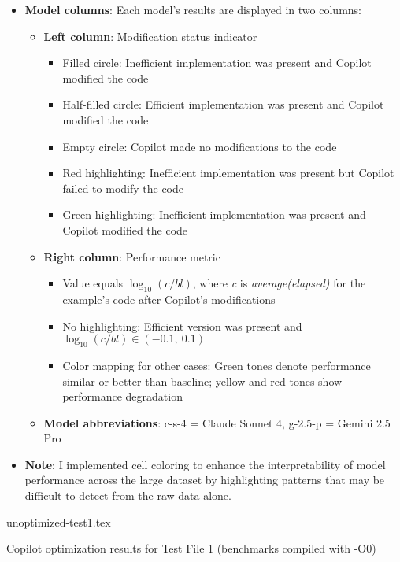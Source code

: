 \begin{itemize}
  \item \textbf{Model columns}: Each model's results are displayed in two columns:
        \begin{itemize}
          \item \textbf{Left column}: Modification status indicator
                \begin{itemize}
                  \item Filled circle: Inefficient implementation was present and Copilot modified the code
                  \item Half-filled circle: Efficient implementation was present and Copilot modified the code
                  \item Empty circle: Copilot made no modifications to the code
                  \item Red highlighting: Inefficient implementation was present but Copilot failed to modify the code
                  \item Green highlighting: Inefficient implementation was present and Copilot modified the code
                \end{itemize}
          \item \textbf{Right column}: Performance metric
                \begin{itemize}
                  \item Value equals $\log_{10}(c / bl)$, where \emph{c} is \emph{average(elapsed)} for the example's code after Copilot's modifications
                  \item No highlighting: Efficient version was present and $\log_{10}(c / bl) \in (-0.1,\ 0.1)$
                  \item Color mapping for other cases: Green tones denote performance similar or better than baseline; yellow and red tones show performance degradation
                \end{itemize}
                \item \textbf{Model abbreviations}: c-s-4 = Claude Sonnet 4, g-2.5-p = Gemini 2.5 Pro
        \end{itemize}
  \item \textbf{Note}: I implemented cell coloring to enhance the interpretability of model performance across the large dataset by highlighting patterns that may be difficult to detect from the raw data alone.
\end{itemize}

\begin{table}
  \centering
  {unoptimized-test1.tex}
  \caption{Copilot optimization results for Test File 1 (benchmarks compiled with -O0)}
  \label{tab:unoptimized-test1}
\end{table}

